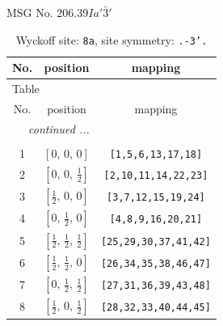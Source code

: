 \documentclass[fleqn,8pt]{jsarticle}
\begin{document}
\setcounter{MaxMatrixCols}{32}

\renewcommand{\tablename}{Table~}
\renewcommand{\figurename}{Figure~}
\begin{center}
\LARGE
MSG No. 206.39\quad$Ia'\bar{3}'$
\end{center}
\renewcommand{\arraystretch}{1.2}
\begin{longtable}{ccc}
\caption{Wyckoff site: {\tt 8a}, site symmetry: {\tt .-3'.}}
 \\
 \hline \hline
No. & position & mapping \\ \hline \endfirsthead

\multicolumn{2}{l}{\tablename\ \thetable{}} \\
 \hline \hline
No. & position & mapping \\ \hline \endhead

 \hline \hline
\multicolumn{2}{r}{\footnotesize\it continued ...} \\ \endfoot

 \hline \hline
\multicolumn{2}{r}{} \\ \endlastfoot

1 & $\left[ 0,\, 0,\, 0 \right]$ & {\tt [1,5,6,13,17,18]} \\ \hline
2 & $\left[ 0,\, 0,\, \frac{1}{2} \right]$ & {\tt [2,10,11,14,22,23]} \\ \hline
3 & $\left[ \frac{1}{2},\, 0,\, 0 \right]$ & {\tt [3,7,12,15,19,24]} \\ \hline
4 & $\left[ 0,\, \frac{1}{2},\, 0 \right]$ & {\tt [4,8,9,16,20,21]} \\ \hline
5 & $\left[ \frac{1}{2},\, \frac{1}{2},\, \frac{1}{2} \right]$ & {\tt [25,29,30,37,41,42]} \\ \hline
6 & $\left[ \frac{1}{2},\, \frac{1}{2},\, 0 \right]$ & {\tt [26,34,35,38,46,47]} \\ \hline
7 & $\left[ 0,\, \frac{1}{2},\, \frac{1}{2} \right]$ & {\tt [27,31,36,39,43,48]} \\ \hline
8 & $\left[ \frac{1}{2},\, 0,\, \frac{1}{2} \right]$ & {\tt [28,32,33,40,44,45]} \\
\end{longtable}
\renewcommand{\arraystretch}{1.2}
\end{document}
